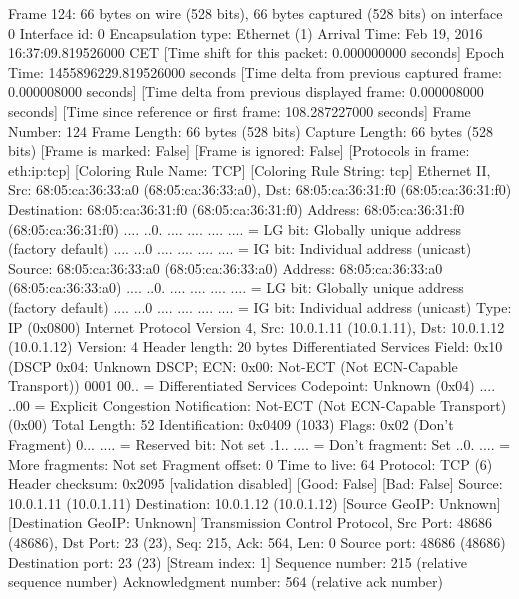 Frame 124: 66 bytes on wire (528 bits), 66 bytes captured (528 bits) on interface 0
    Interface id: 0
    Encapsulation type: Ethernet (1)
    Arrival Time: Feb 19, 2016 16:37:09.819526000 CET
    [Time shift for this packet: 0.000000000 seconds]
    Epoch Time: 1455896229.819526000 seconds
    [Time delta from previous captured frame: 0.000008000 seconds]
    [Time delta from previous displayed frame: 0.000008000 seconds]
    [Time since reference or first frame: 108.287227000 seconds]
    Frame Number: 124
    Frame Length: 66 bytes (528 bits)
    Capture Length: 66 bytes (528 bits)
    [Frame is marked: False]
    [Frame is ignored: False]
    [Protocols in frame: eth:ip:tcp]
    [Coloring Rule Name: TCP]
    [Coloring Rule String: tcp]
Ethernet II, Src: 68:05:ca:36:33:a0 (68:05:ca:36:33:a0), Dst: 68:05:ca:36:31:f0 (68:05:ca:36:31:f0)
    Destination: 68:05:ca:36:31:f0 (68:05:ca:36:31:f0)
        Address: 68:05:ca:36:31:f0 (68:05:ca:36:31:f0)
        .... ..0. .... .... .... .... = LG bit: Globally unique address (factory default)
        .... ...0 .... .... .... .... = IG bit: Individual address (unicast)
    Source: 68:05:ca:36:33:a0 (68:05:ca:36:33:a0)
        Address: 68:05:ca:36:33:a0 (68:05:ca:36:33:a0)
        .... ..0. .... .... .... .... = LG bit: Globally unique address (factory default)
        .... ...0 .... .... .... .... = IG bit: Individual address (unicast)
    Type: IP (0x0800)
Internet Protocol Version 4, Src: 10.0.1.11 (10.0.1.11), Dst: 10.0.1.12 (10.0.1.12)
    Version: 4
    Header length: 20 bytes
    Differentiated Services Field: 0x10 (DSCP 0x04: Unknown DSCP; ECN: 0x00: Not-ECT (Not ECN-Capable Transport))
        0001 00.. = Differentiated Services Codepoint: Unknown (0x04)
        .... ..00 = Explicit Congestion Notification: Not-ECT (Not ECN-Capable Transport) (0x00)
    Total Length: 52
    Identification: 0x0409 (1033)
    Flags: 0x02 (Don't Fragment)
        0... .... = Reserved bit: Not set
        .1.. .... = Don't fragment: Set
        ..0. .... = More fragments: Not set
    Fragment offset: 0
    Time to live: 64
    Protocol: TCP (6)
    Header checksum: 0x2095 [validation disabled]
        [Good: False]
        [Bad: False]
    Source: 10.0.1.11 (10.0.1.11)
    Destination: 10.0.1.12 (10.0.1.12)
    [Source GeoIP: Unknown]
    [Destination GeoIP: Unknown]
Transmission Control Protocol, Src Port: 48686 (48686), Dst Port: 23 (23), Seq: 215, Ack: 564, Len: 0
    Source port: 48686 (48686)
    Destination port: 23 (23)
    [Stream index: 1]
    Sequence number: 215    (relative sequence number)
    Acknowledgment number: 564    (relative ack number)

